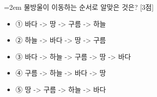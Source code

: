 \documentclass[12pt,a4paper]{article}
\newcommand{\qnum}[1]{%
  \tikz[baseline=(num.base)]{%
    \node[circle, fill=numCircle, text=white, inner sep=0pt,
          minimum size=18pt, font=\small\bfseries] (num) {#1};%
  }%
}
\newcommand{\pts}[1]{%
  \hfill\textcolor{ptsBadge}{[#1점]}%
}
\begin{document}
\vspace{4mm}
\begin{samepage}
{\hangindent=2em
\qnum{48}\enspace 물방울이 이동하는 순서로 알맞은 것은? \pts{3}
\par}

\vspace{3mm}
\begin{itemize}[leftmargin=2.5em, labelsep=0.3em, label={}, itemsep=4pt, parsep=1pt, topsep=0pt]
  \item ① 바다 -> 땅 -> 구름 -> 하늘
  \item ② 하늘 -> 바다 -> 땅 -> 구름
  \item ③ 바다 -> 하늘 -> 구름 -> 땅 -> 바다
  \item ④ 구름 -> 하늘 -> 바다 -> 땅
  \item ⑤ 땅 -> 구름 -> 하늘 -> 바다
\end{itemize}
\end{samepage}
\end{document}
